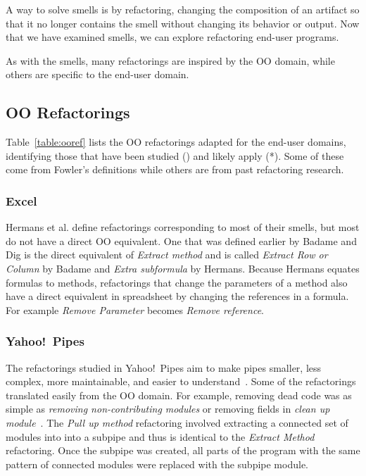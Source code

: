 \documentclass[10pt,conference,compsocconf]{IEEEtran}
\begin{document}
A way to solve smells is by refactoring, changing the composition of an artifact so that it no longer contains the smell without changing its behavior or output.
Now that we have examined smells, we can explore refactoring end-user programs.

As with the smells, many refactorings are inspired by the OO domain, while others are specific to the end-user domain. 

\subsection{OO Refactorings}
Table~\ref{table:ooref} lists the OO refactorings adapted for the end-user domains, identifying those that have been studied () and likely apply (*).
Some of these come from Fowler's definitions while others are from past refactoring research. 

\subsubsection{Excel}

Hermans et al. \cite{Hermans2012intraExt} define refactorings corresponding to most of their smells, but most do not have a direct OO equivalent.
One that was defined earlier by Badame and Dig \cite{badame2012refactoring} is the direct equivalent of \emph{Extract method} and is called \emph{Extract Row or Column} by Badame and \emph{Extra subformula} by Hermans.
Because Hermans equates formulas to methods, refactorings that change the parameters of a method also have a direct equivalent in spreadsheet by changing the references in a formula. For example \emph{Remove Parameter} becomes \emph{Remove reference}.
 
\subsubsection{Yahoo!\ Pipes}
The refactorings studied in Yahoo!\ Pipes aim to make pipes smaller, less complex, more maintainable, and easier to understand~\cite{StoleeTSE2013}.
Some of the refactorings translated easily from the OO domain. For example, removing dead code was as simple as \emph{removing non-contributing modules} or removing fields in \emph{clean up module}~\cite{StoleeTSE2013}.
The \emph{Pull up method} refactoring involved extracting a connected set of modules into into a subpipe and thus is identical to the \emph{Extract Method} refactoring.
Once the subpipe was created, all  parts of the program with the same pattern of connected modules were replaced with the subpipe module. 
\end{document}
